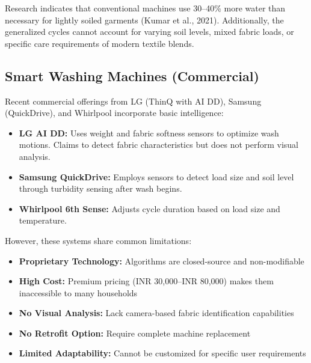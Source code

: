 Research indicates that conventional machines use 30–40\% more water than necessary for lightly soiled garments (Kumar et al., 2021). Additionally, the generalized cycles cannot account for varying soil levels, mixed fabric loads, or specific care requirements of modern textile blends.


\subsection{Smart Washing Machines (Commercial)}
Recent commercial offerings from LG (ThinQ with AI DD), Samsung (QuickDrive), and Whirlpool incorporate basic intelligence:
\begin{itemize}
    \item \textbf{LG AI DD:} Uses weight and fabric softness sensors to optimize wash motions. Claims to detect fabric characteristics but does not perform visual analysis.
    \item \textbf{Samsung QuickDrive:} Employs sensors to detect load size and soil level through turbidity sensing after wash begins.
    \item \textbf{Whirlpool 6th Sense:} Adjusts cycle duration based on load size and temperature.
\end{itemize}
However, these systems share common limitations:
\begin{itemize}
    \item \textbf{Proprietary Technology:} Algorithms are closed-source and non-modifiable
    \item \textbf{High Cost:} Premium pricing (INR 30,000–INR 80,000) makes them inaccessible to many households
    \item \textbf{No Visual Analysis:} Lack camera-based fabric identification capabilities
    \item \textbf{No Retrofit Option:} Require complete machine replacement
    \item \textbf{Limited Adaptability:} Cannot be customized for specific user requirements
\end{itemize}


